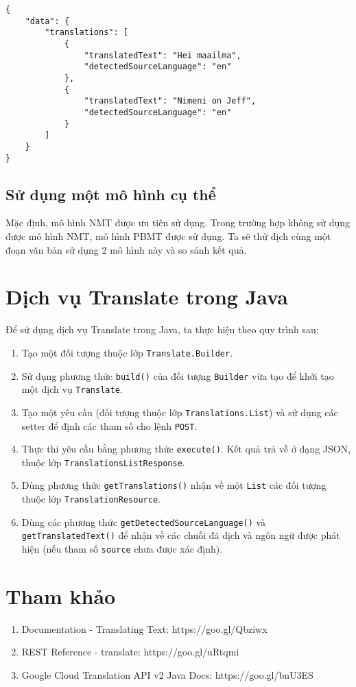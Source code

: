 \documentclass[../thesis.tex]{subfiles}
\begin{document}
\begin{lstlisting}[style=link]
{
	"data": {
		"translations": [
			{
				"translatedText": "Hei maailma",
				"detectedSourceLanguage": "en"
			},
			{
				"translatedText": "Nimeni on Jeff",
				"detectedSourceLanguage": "en"
			}
		]
	}
}
\end{lstlisting}

\subsection{Sử dụng một mô hình cụ thể}
Mặc định, mô hình NMT được ưu tiên sử dụng. Trong trường hợp không sử dụng được mô hình NMT, mô hình PBMT được sử dụng. Ta sẽ thử dịch cùng một đoạn văn bản sử dụng 2 mô hình này và so sánh kết quả.


\section{Dịch vụ Translate trong Java}
Để sử dụng dịch vụ Translate trong Java, ta thực hiện theo quy trình sau:
\begin{enumerate}
  \item Tạo một đối tượng thuộc lớp \lstinline{Translate.Builder}.
  \item Sử dụng phương thức \lstinline{build()} của đối tượng \lstinline{Builder} vừa tạo để khởi tạo một dịch vụ \lstinline{Translate}.
  \item Tạo một yêu cầu (đối tượng thuộc lớp \lstinline{Translations.List}) và sử dụng các setter để định các tham số cho lệnh \lstinline{POST}.
  \item Thực thi yêu cầu bằng phương thức \lstinline{execute()}. Kết quả trả về ở dạng JSON, thuộc lớp \lstinline{TranslationsListResponse}.
  \item Dùng phương thức \lstinline{getTranslations()} nhận về một \lstinline{List} các đối tượng thuộc lớp \lstinline{TranslationResource}.
  \item Dùng các phương thức \lstinline{getDetectedSourceLanguage()} và \lstinline{getTranslatedText()} để nhận về các chuỗi đã dịch và ngôn ngữ được phát hiện (nếu tham số \lstinline{source} chưa được xác định).
\end{enumerate}

\section*{Tham khảo}

\begin{enumerate}
  \item Documentation - Translating Text: https://goo.gl/Qbziwx
  \item REST Reference - translate: https://goo.gl/uRtqmi
  \item Google Cloud Translation API v2 Java Docs: https://goo.gl/bnU3ES
\end{enumerate}
\end{document}
